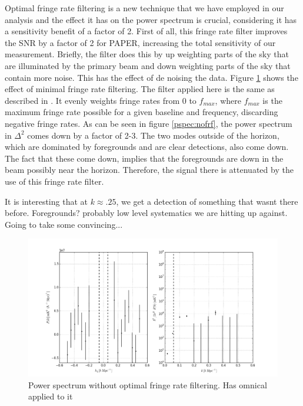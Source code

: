 \documentclass[twocolumn,numberedappendix]{emulateapj} \shorttitle{PSA64}
\begin{document}
Optimal fringe rate filtering is a new technique that we have employed in our
analysis and the effect it has on the power spectrum is crucial, considering it
has a sensitivity benefit of a factor of 2. First of all, this fringe rate
filter improves the SNR by a factor of 2 for PAPER, increasing the total
sensitivity of our measurement. Briefly, the filter does this by up weighting
parts of the sky that are illuminated by the primary beam and down weighting
parts of the sky that contain more noise. This has the effect of de noising the
data. Figure \ref{fig:pspec_nofrf} shows the effect of minimal fringe rate
filtering. The filter applied here is the same as described in
\cite{parsons_et_al2014a}. It evenly weights fringe rates from 0 to $f_{max}$,
where $f_{max}$ is the maximum fringe rate possible for a given baseline and
frequency, discarding negative fringe rates. As can be seen in figure
\ref{pspec:nofrf}, the power spectrum in $\Delta^{2}$ comes down by a factor of
2-3. The two modes outside of the horizon, which are dominated by foregrounds
and are clear detections, also come down. The fact that these come down, implies
that the foregrounds are down in the beam possibly near the horizon. Therefore,
the signal there is attenuated by the use of this fringe rate filter. 

It is interesting that at $k\approx.25$, we get a detection of something that
wasnt there before. Foregrounds? probably low level systematics we are hitting
up against. Going to take some convincing...


\begin{figure}[t!]\centering
\includegraphics[width=\columnwidth]{plots/pk_k3pk_nofrf.png}
\caption{Power spectrum without optimal fringe rate filtering. Has omnical
applied to it}
\label{fig:pspec_nofrf}
\end{figure}
\end{document}
